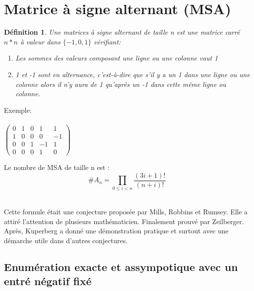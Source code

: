 \documentclass{book}
\newtheorem{petit_nom2}{Définition}[chapter]
\begin{document}
 \section{Matrice à signe alternant (MSA)}
 \begin{petit_nom2}
 Une matrices à signe alternant de taille n est une matrice carré $n*n$ à valeur dans $\{-1,0,1\}$ vérifiant:\\
 \begin{enumerate}
 \item Les sommes des valeurs composant une ligne ou une colonne vaut 1
 \item  1 et -1 sont en alternance, c'est-à-dire que s'il y a un 1 dans une ligne ou une colonne alors il n'y aura de 1 qu'après un -1 dans cette même ligne ou colonne.
 \end{enumerate}
 \end{petit_nom2}
  Exemple:\\\\
$ \begin{pmatrix}
 0&1&0&1&1\\1&0&0&0&-1\\0&0&1&-1&1\\0&0&0&1&0
 \end{pmatrix} $
 \begin{t}
 Le nombre de MSA de taille n est :\\
 \begin{equation}
\#A_n=\prod_{0\leqslant i<n}\frac{(3i+1)!}{(n+i)!}
 \end{equation}
 \end{t}\\
 Cette formule était une conjecture proposée par Mills, Robbins et Rumsey. Elle a attiré l'attention de plusieurs mathématicien. Finalement prouvé par Zeilberger. Après, Kuperberg a donné une démonstration pratique et surtout avec une démarche utile dans d'autres conjectures.\\
 \subsection{Enumération exacte et assympotique avec un entré négatif fixé}
\end{document}
